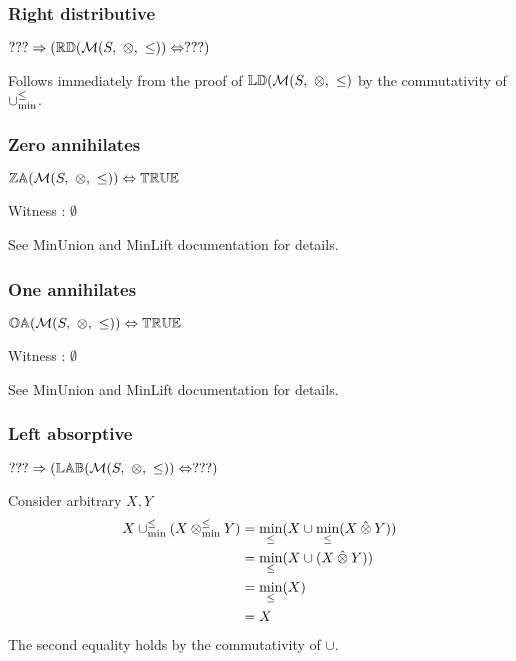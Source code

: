 \documentclass[../Summary.tex]{subfiles}
\begin{document}
\subsubsection{Right distributive}

$??? \Rightarrow ({\mathbb{RD}}(\mathcal{M}(S,\ \otimes,\ \leq))  \Leftrightarrow ???)$

\proof

Follows immediately from the proof of $\propname{LD}(\mathcal{M}(S,\ \otimes,\ \leq)$ by the commutativity of $\mathbin{\cup_{\min}^{\leq}}$.



\subsubsection{Zero annihilates}

$\propname{ZA}(\mathcal{M}(S,\ \otimes,\ \leq)) \Leftrightarrow \propname{TRUE}$

\proof

Witness : $\emptyset$

\vspace{0.5em}

See MinUnion and MinLift documentation for details.



\subsubsection{One annihilates}

$\propname{OA}(\mathcal{M}(S,\ \otimes,\ \leq)) \Leftrightarrow \propname{TRUE}$

\proof

Witness : $\emptyset$

\vspace{0.5em}

See MinUnion and MinLift documentation for details.


\subsubsection{Left absorptive}

$??? \Rightarrow ({\mathbb{LAB}}(\mathcal{M}(S,\ \otimes,\ \leq)) \Leftrightarrow ???)$

\proof

Consider arbitrary $X, Y$
\begin{align*}
X \mathbin{\cup_{\min}^{\leq}} (X \mathbin{\otimes_{\min}^{\leq}} Y) 	& = \min_\leq(X \cup \min_\leq(X \mathbin{\hat{\otimes}} Y)) \\
							& = \min_\leq(X \cup (X \mathbin{\hat{\otimes}} Y)) \\
							& = \min_\leq(X) \\
							& = X
\end{align*}
The second equality holds by the commutativity of $\cup$.
\end{document}
